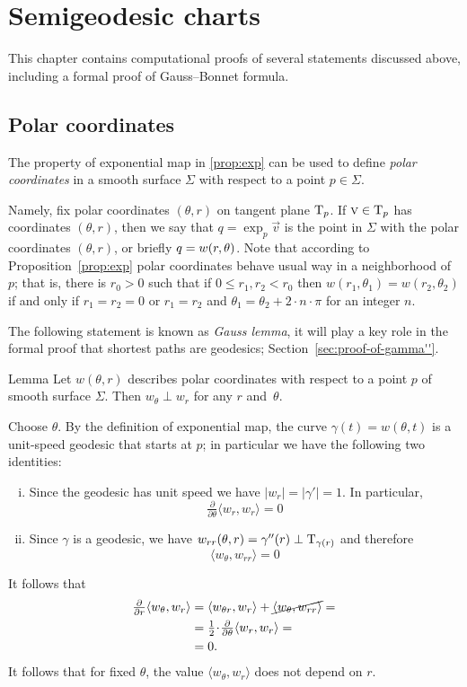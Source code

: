 \chapter{Semigeodesic charts}\label{chap:semigeodesic}

This chapter contains computational proofs of several statements discussed above, including a formal proof of Gauss--Bonnet formula.


\section{Polar coordinates}

The property of exponential map in \ref{prop:exp} can be used to define \emph{polar coordinates} in a smooth surface $\Sigma$ with respect to a point $p\in \Sigma$.

Namely, fix polar coordinates $(\theta,r)$ on tangent plane $\mathrm{T}_p$.
If $\textsc v\in \mathrm{T}_p$ has coordinates $(\theta,r)$,
then we say that $q=\exp_p\vec v$ is the point in $\Sigma$ with the polar coordinates $(\theta,r)$, or briefly $q\z=w(r,\theta)$.
Note that according to Proposition~\ref{prop:exp} polar coordinates behave usual way in a neighborhood of $p$;
that is, there is $r_0>0$ such that if $0\le r_1,r_2<r_0$ then $w(r_1,\theta_1) = w(r_2,\theta_2)$ if and only if
$r_1=r_2=0$ or $r_1=r_2$ and $\theta_1=\theta_2+2\cdot n\cdot\pi$ for an integer $n$.

The following statement is known as \emph{Gauss lemma},
it will play a key role in the formal proof that shortest paths are geodesics; Section~\ref{sec:proof-of-gamma''}.

\begin{thm}{Lemma}\label{lem:palar-perp}
Let $w(\theta,r)$ describes polar coordinates with respect to a point $p$ of smooth surface $\Sigma$.
Then
$w_\theta\perp w_r$
for any $r$ and~$\theta$.
\end{thm}


Choose $\theta$.
By the definition of exponential map, the curve $\gamma(t)=w(\theta,t)$ is a unit-speed geodesic that starts at $p$;
in particular we have the following two identities:
\begin{enumerate}[(i)]
\item Since the geodesic has unit speed we have $|w_r|=|\gamma'|=1$.
In particular,
 \[
 \tfrac{\partial}{\partial \theta}
 \langle w_r,w_r\rangle=0\]
\item Since $\gamma$ is a geodesic, we have $w_{rr}(\theta,r)=\gamma''(r)\perp\mathrm{T}_{\gamma(r)}$ and therefore 
\[
\langle w_\theta, w_{rr}\rangle=0\]
\end{enumerate}
It follows that
\begin{align*}
\tfrac{\partial}{\partial r}
\langle w_\theta, w_r\rangle
&=
\langle w_{\theta r},w_r\rangle
+
\cancel{\langle w_\theta,w_{rr}\rangle}=
\\
&=
\tfrac12
\cdot 
\tfrac{\partial}{\partial \theta}
\langle w_r, w_r\rangle=
\\
&=0.
\end{align*}
It follows that for fixed $\theta$, the value 
$\langle  w_\theta, w_r\rangle$ does not depend on $r$.

